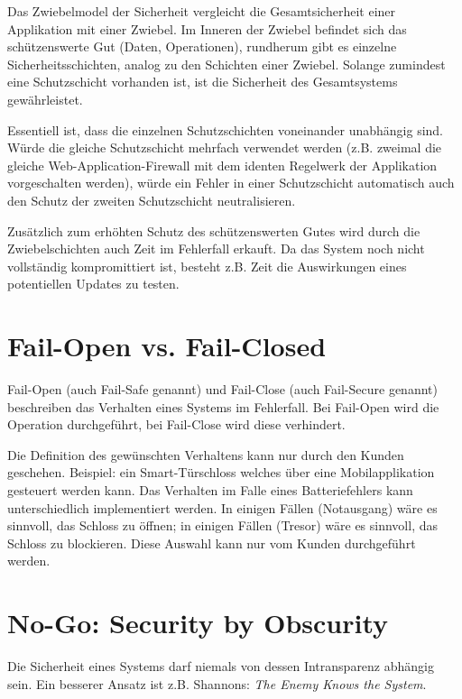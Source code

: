 Das Zwiebelmodel der Sicherheit vergleicht die Gesamtsicherheit einer Applikation mit einer Zwiebel. Im Inneren der Zwiebel befindet sich das schützenswerte Gut (Daten, Operationen), rundherum gibt es einzelne Sicherheitsschichten, analog zu den Schichten einer Zwiebel. Solange zumindest eine Schutzschicht vorhanden ist, ist die Sicherheit des Gesamtsystems gewährleistet.

Essentiell ist, dass die einzelnen Schutzschichten voneinander unabhängig sind. Würde die gleiche Schutzschicht mehrfach verwendet werden (z.B. zweimal die gleiche Web-Application-Firewall mit dem identen Regelwerk der Applikation vorgeschalten werden), würde ein Fehler in einer Schutzschicht automatisch auch den Schutz der zweiten Schutzschicht neutralisieren.

Zusätzlich zum erhöhten Schutz des schützenswerten Gutes wird durch die Zwiebelschichten auch Zeit im Fehlerfall erkauft. Da das System noch nicht vollständig kompromittiert ist, besteht z.B. Zeit die Auswirkungen eines potentiellen Updates zu testen.

\section{Fail-Open vs. Fail-Closed}

Fail-Open (auch Fail-Safe genannt) und Fail-Close (auch Fail-Secure genannt) beschreiben das Verhalten eines Systems im Fehlerfall. Bei Fail-Open wird die Operation durchgeführt, bei Fail-Close wird diese verhindert.

Die Definition des gewünschten Verhaltens kann nur durch den Kunden geschehen. Beispiel: ein Smart-Türschloss welches über eine Mobilapplikation gesteuert werden kann. Das Verhalten im Falle eines Batteriefehlers kann unterschiedlich implementiert werden. In einigen Fällen (Notausgang) wäre es sinnvoll, das Schloss zu öffnen; in einigen Fällen (Tresor) wäre es sinnvoll, das Schloss zu blockieren. Diese Auswahl kann nur vom Kunden durchgeführt werden.

\section{No-Go: Security by Obscurity}

Die Sicherheit eines Systems darf niemals von dessen Intransparenz abhängig sein. Ein besserer Ansatz ist z.B. Shannons: \textit{The Enemy Knows the System}.

